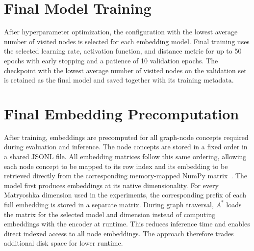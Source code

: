 \section{Final Model Training}
\label{sec:train_final_training}

After hyperparameter optimization, the configuration with the lowest average number of visited nodes is selected for each embedding model. Final training uses the selected learning rate, activation function, and distance metric for up to 50 epochs with early stopping and a patience of 10 validation epochs. The checkpoint with the lowest average number of visited nodes on the validation set is retained as the final model and saved together with its training metadata.

\section{Final Embedding Precomputation}
\label{sec:train_final_precomputation}

After training, embeddings are precomputed for all graph-node concepts required during evaluation and inference. The node concepts are stored in a fixed order in a shared JSONL file. All embedding matrices follow this same ordering, allowing each node concept to be mapped to its row index and its embedding to be retrieved directly from the corresponding memory-mapped NumPy matrix~\cite{harris:2020}. The model first produces embeddings at its native dimensionality. For every Matryoshka dimension used in the experiments, the corresponding prefix of each full embedding is stored in a separate matrix. During graph traversal, $A^*$ loads the matrix for the selected model and dimension instead of computing embeddings with the encoder at runtime. This reduces inference time and enables direct indexed access to all node embeddings. The approach therefore trades additional disk space for lower runtime.
